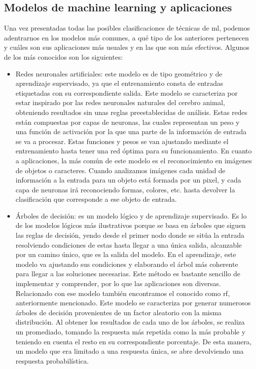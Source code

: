 \subsection{Modelos de machine learning y aplicaciones}
\par Una vez presentadas todas las posibles clasificaciones de técnicas de \gls{ml}, podemos adentrarnos en los modelos más comunes, a qué tipo de los anteriores pertenecen y cuáles son sus aplicaciones más usuales y en las que son más efectivos. Algunos de los más conocidos son los siguientes:
\begin{itemize}
	\item Redes neuronales artificiales: este modelo es de tipo geométrico y de aprendizaje supervisado, ya que el entrenamiento consta de entradas etiquetadas con su correspondiente salida. Este modelo se caracteriza por estar inspirado por las redes neuronales naturales del cerebro animal, obteniendo resultados sin unas reglas preestablecidas de análisis. Estas redes están compuestas por capas de neuronas, las cuales representan un peso y una función de activación por la que una parte de la información de entrada se va a procesar. Estas funciones y pesos se van ajustando mediante el entrenamiento hasta tener una red óptima para su funcionamiento. En cuanto a aplicaciones, la más común de este modelo es el reconocimiento en imágenes de objetos o caracteres. Cuando analizamos imágenes cada unidad de información a la entrada para un objeto está formada por un pixel, y cada capa de neuronas irá reconociendo formas, colores, etc. hasta devolver la clasificación que corresponde a ese objeto de entrada. 
	\item Árboles de decisión: es un modelo lógico y de aprendizaje supervisado. Es lo de los modelos lógicos más ilustrativos porque se basa en árboles que siguen las reglas de decisión, yendo desde el primer nodo donde se sitúa la entrada resolviendo condiciones de estas hasta llegar a una única salida, alcanzable por un camino único, que es la salida del modelo. En el aprendizaje, este modelo va ajustando sus condiciones y elaborando el árbol más coherente para llegar a las soluciones necesarias. Este método es bastante sencillo de implementar y comprender, por lo que las aplicaciones son diversas. Relacionado con ese modelo también encontramos el conocido como \gls{rf}, anteriormente mencionado. Este modelo se caracteriza por generar numerosos árboles de decisión provenientes de un factor aleatorio con la misma distribución. Al obtener los resultados de cada uno de los árboles, se realiza un promediado, tomando la respuesta más repetida como la más probable y teniendo en cuenta el resto en su correspondiente porcentaje. De esta manera, un modelo que era limitado a una respuesta única, se abre devolviendo una respuesta probabilística. 

\end{itemize}
